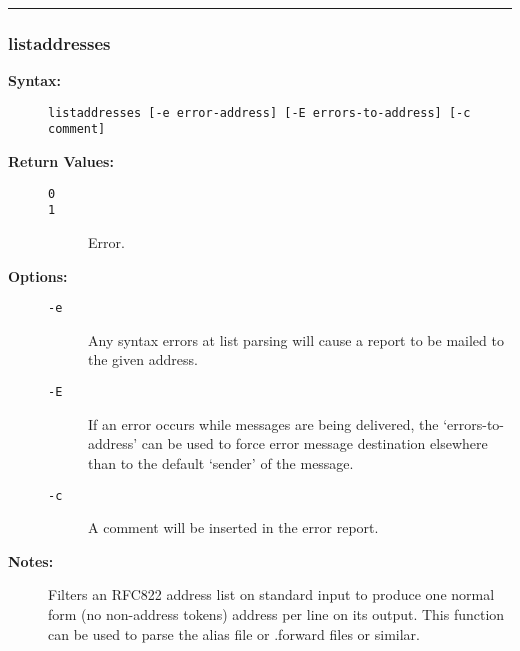 \hrule
\subsubsection{listaddresses}

\begin{description}
\item[{\bf Syntax:}] \mbox{}

{\tt listaddresses [-e error-address] [-E errors-to-address] [-c comment]}

\item[{\bf Return Values:}] \mbox{}

\begin{description}
\item[{\tt 0}] \mbox{}



\item[{\tt 1}] \mbox{}

Error.

\end{description}


\item[{\bf Options:}] \mbox{}

\begin{description}
\item[{\tt -e}] \mbox{}

Any syntax errors at list parsing will cause a 
report to be mailed to the given address.

\item[{\tt -E}] \mbox{}

If an error occurs while messages are being delivered, 
the `errors-to-address' can be used to force error message destination 
elsewhere than to the default `sender' of the message.

\item[{\tt -c}] \mbox{}

A comment will be inserted in the error report.

\end{description}


\item[{\bf Notes:}] \mbox{}

Filters an RFC822 address list on standard input 
to produce one normal form (no non-address tokens) address per line on 
its output. This function can be used to parse the alias file or .forward 
files or similar.

\end{description}


